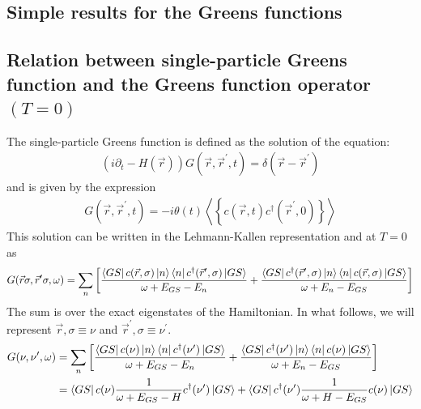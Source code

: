 \documentclass{report}
\numberwithin{equation}{section}
\begin{document}
\begin{appendices}
\chapter{Simple results for the Greens functions}
\section{Relation between single-particle Greens function and the Greens function operator $(T=0)$}
 The single-particle Greens function is defined as the solution of the equation:
 \begin{equation}\begin{aligned}
	 \left(i\partial_t - H(\vec r)\right)G(\vec r,\vec r^\prime, t) = \delta(\vec r - \vec r^\prime)
 \end{aligned}\end{equation}
 and is given by the expression
 \begin{equation}\begin{aligned}
	 G(\vec r,\vec r^\prime, t) = -i \theta(t) \left< \left\{ c(\vec r, t) c^\dagger(\vec r^\prime, 0)\right\} \right>
 \end{aligned}\end{equation}
 This solution can be written in the Lehmann-Kallen representation  and at $T=0$ as
 \begin{equation}\begin{aligned}
	 G(\vec r \sigma, \vec r^\prime \sigma, \omega) = \sum_{n}\left[\frac{\bra{GS}c({\vec r,\sigma})\ket{n}\bra{n}c^\dagger(\vec r^\prime,\sigma)\ket{GS}}{\omega + E_{GS} - E_n} + \frac{\bra{GS}c^\dagger(\vec r^\prime,\sigma)\ket{n}\bra{n}c({\vec r,\sigma})\ket{GS}}{\omega + E_n - E_{GS}}\right]
 \end{aligned}\end{equation}
 The sum is over the exact eigenstates of the Hamiltonian. In what follows, we will represent $\vec r,\sigma \equiv \nu$ and $\vec r^\prime,\sigma \equiv \nu^\prime$.
 \begin{equation}\begin{aligned}
	 G(\nu, \nu^\prime, \omega) &= \sum_{n}\left[\frac{\bra{GS}c(\nu)\ket{n}\bra{n}c^\dagger(\nu^\prime)\ket{GS}}{\omega + E_{GS} - E_n} + \frac{\bra{GS}c^\dagger(\nu^\prime)\ket{n}\bra{n}c(\nu)\ket{GS}}{\omega + E_n - E_{GS}}\right]\\
							&= \bra{GS}c(\nu)\frac{1}{\omega + E_{GS} - H}c^\dagger(\nu^\prime)\ket{GS} + \bra{GS}c^\dagger(\nu^\prime)\frac{1}{\omega + H - E_{GS}}c(\nu)\ket{GS}\\
 \end{aligned}\end{equation}

\end{appendices}
\end{document}
